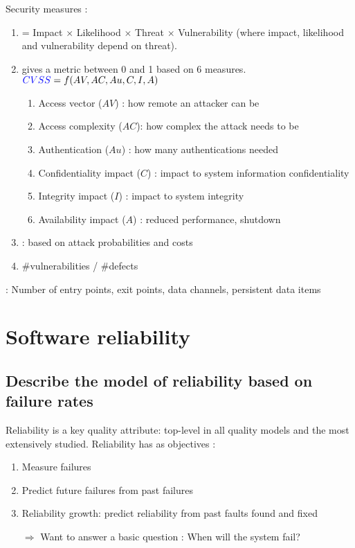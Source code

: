 Security measures :
\begin{enumerate}
    \item {} = Impact $\times$ Likelihood $\times$ Threat $\times$ Vulnerability (where impact, likelihood and vulnerability depend on threat).
    \item {} gives a metric between 0 and 1 based on 6 measures. $\textblue{CVSS} = f(AV, AC, Au, C, I, A)$
    \begin{enumerate}
        \item Access vector ($AV$) : how remote an attacker can be
        \item Access complexity ($AC$): how complex the attack needs to be
        \item Authentication ($Au$) : how many authentications needed
        \item Confidentiality impact ($C$) : impact to system information confidentiality
        \item Integrity impact ($I$) : impact to system integrity
        \item Availability impact ($A$) : reduced performance, shutdown
    \end{enumerate}
    \item {} : based on attack probabilities and costs
    \item \#vulnerabilities / \#defects
\end{enumerate}

\noindent {} : Number of entry points, exit points, data channels, persistent data items

\chapter{Software reliability}

\section{Describe the model of reliability based on failure rates}

Reliability is a key quality attribute: top-level in all quality models and the most extensively studied.
Reliability has as objectives :
\begin{enumerate}
    \item Measure failures
    \item Predict future failures from past failures
    \item Reliability growth: predict reliability from past faults found and fixed
    \item[$\Rightarrow$] Want to answer a basic question : When will the system fail?
\end{enumerate}


